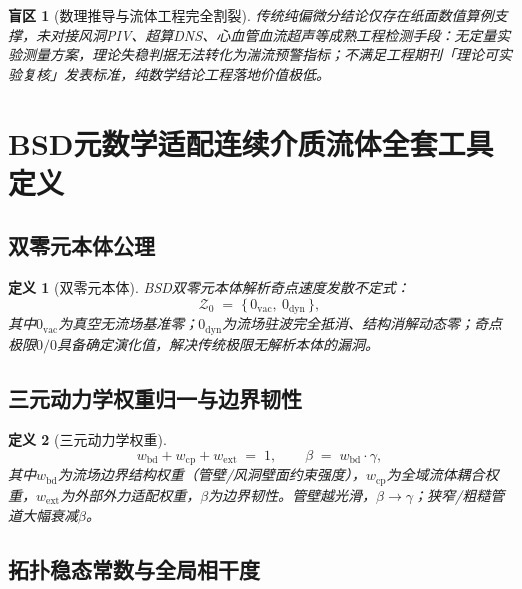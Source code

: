 \documentclass[11pt,a4paper]{ctexart}
\newtheorem{definition}{定义}
\newtheorem{blindspot}{盲区}
\theoremstyle{remark}
\begin{document}
\begin{blindspot}[数理推导与流体工程完全割裂]\label{bs:three}
传统纯偏微分结论仅存在纸面数值算例支撑，未对接风洞PIV、超算DNS、心血管血流超声等成熟工程检测手段：无定量实验测量方案，理论失稳判据无法转化为湍流预警指标；不满足工程期刊「理论可实验复核」发表标准，纯数学结论工程落地价值极低。
\end{blindspot}

\section{BSD元数学适配连续介质流体全套工具定义}\label{sec:bsd-tools}

\subsection{双零元本体公理}\label{sec:dual-zero}

\begin{definition}[双零元本体]\label{def:dual-zero}
BSD双零元本体解析奇点速度发散不定式：
\begin{equation}\label{eq:dual-zero}
\mathcal{Z}_{0} \;=\; \{\,0_{\mathrm{vac}},\ 0_{\mathrm{dyn}}\,\},
\end{equation}
其中$0_{\mathrm{vac}}$为真空无流场基准零；$0_{\mathrm{dyn}}$为流场驻波完全抵消、结构消解动态零；奇点极限$0/0$具备确定演化值，解决传统极限无解析本体的漏洞。
\end{definition}

\subsection{三元动力学权重归一与边界韧性}\label{sec:ternary}

\begin{definition}[三元动力学权重]\label{def:ternary}
\begin{equation}\label{eq:ternary}
w_{\mathrm{bd}} + w_{\mathrm{cp}} + w_{\mathrm{ext}} \;=\; 1,
\qquad \beta \;=\; w_{\mathrm{bd}}\cdot\gamma,
\end{equation}
其中$w_{\mathrm{bd}}$为流场边界结构权重（管壁/风洞壁面约束强度），$w_{\mathrm{cp}}$为全域流体耦合权重，$w_{\mathrm{ext}}$为外部外力适配权重，$\beta$为边界韧性。管壁越光滑，$\beta\to\gamma$；狭窄/粗糙管道大幅衰减$\beta$。
\end{definition}

\subsection{拓扑稳态常数与全局相干度}\label{sec:pi2-gc}
\end{document}
